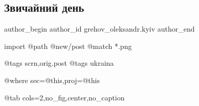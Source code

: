  
 
 
 
 
 
\subsection{Звичайний день}
\label{sec:20_11_2022.fb.grehov_oleksandr.kyiv.1.zvychajnyj_den}
 
\ifcmt
 author_begin
   author_id grehov_oleksandr.kyiv
 author_end
\fi

\ifcmt
  import
    @path @new/post
    @match *.png

    @tags scrn,orig.post
    @tags ukraina

    @where sec=@this,proj=@this
  
    @tab cols=2,no_fig,center,no_caption
\fi
